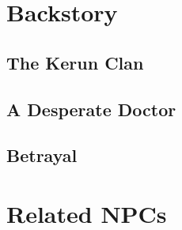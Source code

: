 \documentclass[12pt]{article}
\begin{document}
\section{Backstory}

\subsection{The Kerun Clan}

\subsection{A Desperate Doctor}

\subsection{Betrayal}

\section{Related NPCs}
\end{document}
